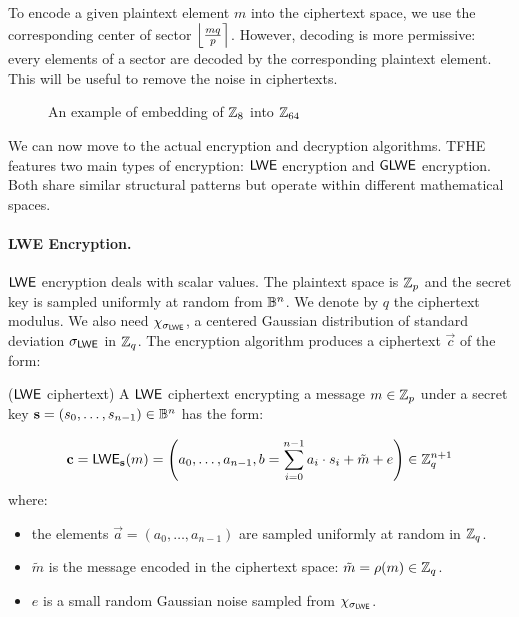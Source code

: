 To encode a given plaintext element $m$ into the ciphertext space, we use the corresponding center of sector $\left \lfloor \frac{mq}{p} \right \rceil$. However, decoding is more permissive: every elements of a sector are decoded by the corresponding plaintext element. This will be useful to remove the noise in ciphertexts.

\begin{figure}[htbp]
	\centering
	\caption{An example of embedding of $\mathbb{Z}_8$ into $\mathbb{Z}_{64}$}
	\label{fig:example_encoding}
\end{figure}

We can now move to the actual encryption and decryption algorithms. TFHE features two main types of encryption: $\textsf{LWE}$ encryption and $\textsf{GLWE}$ encryption. Both share similar structural patterns but operate within different mathematical spaces.

\paragraph{LWE Encryption.}
$\textsf{LWE}$ encryption deals with scalar values. The plaintext space is $\mathbb{Z}_p$ and the secret key is sampled uniformly at random from $\mathbb{B}^n$. We denote by $q$ the ciphertext modulus. We also need 
$\chi_{\sigma_{\textsf{LWE}}}$, a centered Gaussian distribution of standard deviation $\sigma_{\textsf{LWE}}$ in $\mathbb{Z}_q$. The encryption algorithm produces a ciphertext $\vec c$ of the form:

\begin{definition}($\textsf{LWE}$ ciphertext)
	A $\textsf{LWE}$ ciphertext encrypting a message $m \in \mathbb{Z}_p$ under a secret key $\mathbf s=(s_0, \dots, s_{n-1}) \in \mathbb{B}^n$ has the form:
	
	\begin{equation}
		\mathbf c = \textsf{LWE}_{\mathbf s}(m) = \left (a_0, \dots, a_{n-1}, b = \sum_{i=0}^{n-1} a_i \cdot s_i + \tilde m + e \right ) \in \mathbb{Z}_q^{n+1}
	\end{equation}
	where:
	\begin{itemize}
		\item the elements $\vec a = (a_0, \dots, a_{n-1})$ are sampled uniformly at random in $\mathbb{Z}_q$.

		\item $\tilde m$ is the message encoded in the ciphertext space: $\tilde m = \rho(m) \in \mathbb{Z}_q$.
		\item $e$ is a small random Gaussian noise sampled from $\chi_{\sigma_{\textsf{LWE}}}$.
	\end{itemize}
\end{definition}


